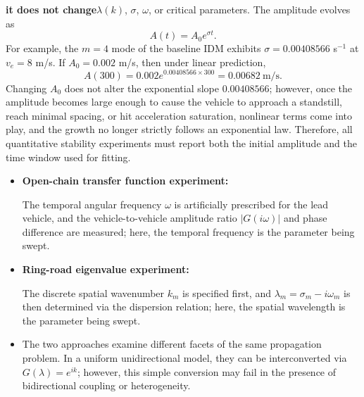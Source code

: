\documentclass[11pt,a4paper,openany]{book}
\numberwithin{equation}{chapter}
\numberwithin{figure}{chapter}
\numberwithin{table}{chapter}
\begin{document}
\textbf{it does not change}$\lambda(k)$, $\sigma$, $\omega$, or critical parameters. The amplitude evolves as
\begin{equation}
A(t)=A_0e^{\sigma t}.
\end{equation}
For example, the $m=4$ mode of the baseline IDM exhibits $\sigma=0.00408566$ s$^{-1}$ at $v_e=8$ m/s. If $A_0=0.002$ m/s, then under linear prediction,
\begin{equation}
A(300)=0.002e^{0.00408566\times300}=0.00682\ \text{m/s}.
\end{equation}
Changing $A_0$ does not alter the exponential slope $0.00408566$; however, once the amplitude becomes large enough to cause the vehicle to approach a standstill, reach minimal spacing, or hit acceleration saturation, nonlinear terms come into play, and the growth no longer strictly follows an exponential law. Therefore, all quantitative stability experiments must report both the initial amplitude and the time window used for fitting.



\begin{tcolorbox}[notebox,title=\textbf{"What is being swept" in open-chain frequency sweeps versus ring-road modal scans}]
\begin{itemize}[leftmargin=1.4em,itemsep=3pt]
\item \textbf{Open-chain transfer function experiment:}

The temporal angular frequency $\omega$ is artificially prescribed for the lead vehicle, and the vehicle-to-vehicle amplitude ratio $|G(i\omega)|$ and phase difference are measured; here, the temporal frequency is the parameter being swept.


\item \textbf{Ring-road eigenvalue experiment:}

The discrete spatial wavenumber $k_m$ is specified first, and $\lambda_m=\sigma_m-i\omega_m$ is then determined via the dispersion relation; here, the spatial wavelength is the parameter being swept.\item The two approaches examine different facets of the same propagation problem. In a uniform unidirectional model, they can be interconverted via $G(\lambda)=e^{ik}$; however, this simple conversion may fail in the presence of bidirectional coupling or heterogeneity.


\end{itemize}
\end{tcolorbox}
\end{document}
